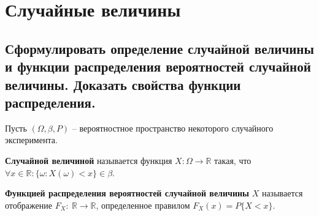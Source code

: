 \chapter{Случайные величины}

\section{Сформулировать определение случайной величины и функции распределения вероятностей случайной величины. Доказать свойства функции распределения.}

Пусть $(\Omega, \beta, P)$ -- вероятностное пространство некоторого случайного эксперимента.

\textbf{Случайной величиной} называется функция $X: \Omega \rightarrow \mathbb{R}$ такая, что $\forall x \in \mathbb{R}: \{\omega: X(\omega) < x\} \in \beta$.

\textbf{Функцией распределения вероятностей случайной величины} $X$ называется отображение $F_X:~\mathbb{R}\rightarrow\mathbb{R}$, определенное правилом $F_X(x) = P\{X < x\}$.


